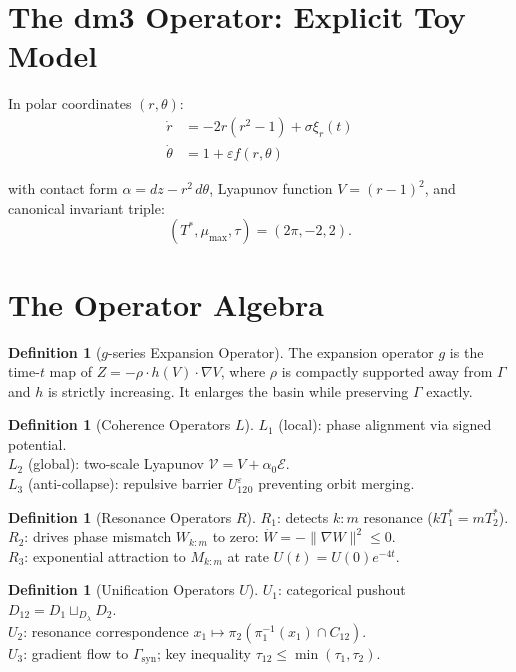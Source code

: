 \documentclass[11pt, twoside, openright]{book}
\theoremstyle{plain}
\theoremstyle{definition}
\newtheorem{definition}[theorem]{Definition}
\newcommand{\eps}{\varepsilon_0}
\begin{document}
\section{The dm3 Operator: Explicit Toy Model}

In polar coordinates $(r, \theta)$:
\begin{align}
\dot r      &= -2r(r^2-1) + \sigma\xi_r(t) \\
\dot\theta  &= 1 + \varepsilon f(r,\theta)
\end{align}

with contact form $\alpha = dz - r^2\,d\theta$, Lyapunov function
$V = (r-1)^2$, and canonical invariant triple:
\[
(T^*, \mu_{\max}, \tau) = (2\pi, -2, 2).
\]

\section{The Operator Algebra}

\begin{definition}[$g$-series Expansion Operator]
The expansion operator $g$ is the time-$t$ map of
$Z = -\rho \cdot h(V) \cdot \nabla V$, where $\rho$ is compactly
supported away from $\Gamma$ and $h$ is strictly increasing.
It enlarges the basin while preserving $\Gamma$ exactly.
\end{definition}

\begin{definition}[Coherence Operators $L$]
\textbf{$L_1$} (local): phase alignment via signed potential.\\
\textbf{$L_2$} (global): two-scale Lyapunov
$\mathcal{V} = V + \alpha_0\mathcal{E}$.\\
\textbf{$L_3$} (anti-collapse): repulsive barrier $U_{12}^\eps$
preventing orbit merging.
\end{definition}

\begin{definition}[Resonance Operators $R$]
\textbf{$R_1$}: detects $k:m$ resonance ($kT_1^* = mT_2^*$).\\
\textbf{$R_2$}: drives phase mismatch $W_{k:m}$ to zero:
$\dot W = -\|\nabla W\|^2 \le 0$.\\
\textbf{$R_3$}: exponential attraction to $M_{k:m}$ at rate
$U(t) = U(0)e^{-4t}$.
\end{definition}

\begin{definition}[Unification Operators $U$]
\textbf{$U_1$}: categorical pushout $D_{12} = D_1 \sqcup_{D_\lambda} D_2$.\\
\textbf{$U_2$}: resonance correspondence
$x_1 \mapsto \pi_2(\pi_1^{-1}(x_1) \cap C_{12})$.\\
\textbf{$U_3$}: gradient flow to $\Gamma_{\mathrm{syn}}$;
key inequality $\tau_{12} \le \min(\tau_1, \tau_2)$.
\end{definition}
\end{document}
